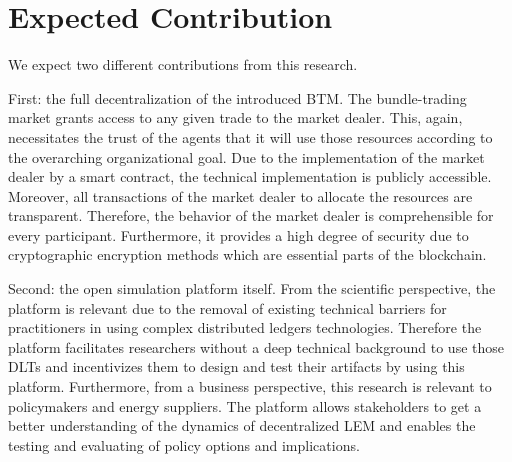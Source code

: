 \section{Expected Contribution}
\label{sec:expected_contribution}

We expect two different contributions from this research. 

First: the full decentralization of the introduced BTM. 
The bundle-trading market grants access to any given trade to the market dealer. 
This, again, necessitates the trust of the agents that it will use those resources
according to the overarching organizational goal. Due to the implementation 
of the market dealer by a smart contract, the technical implementation 
is publicly accessible. Moreover, all transactions of the market dealer 
to allocate the resources are transparent. Therefore, the behavior of the 
market dealer is comprehensible for every participant. Furthermore, it provides 
a high degree of security due to cryptographic encryption methods which are essential 
parts of the blockchain.

Second: the open simulation platform itself. From the scientific perspective, 
the platform is relevant due to the removal of existing technical barriers 
for practitioners in using complex distributed ledgers technologies. 
Therefore the platform facilitates researchers without a deep 
technical background to use those DLTs and incentivizes them to design 
and test their artifacts by using this platform. 
Furthermore, from a business perspective, this research is 
relevant to policymakers and energy suppliers. The platform allows 
stakeholders to get a better understanding of the dynamics of decentralized 
LEM and enables the testing and evaluating of policy options and implications. 

\clearpage